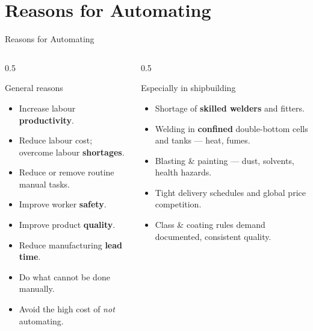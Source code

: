 \documentclass[aspectratio=169]{beamer}
\begin{document}
	\section{Reasons for Automating}
	\begin{frame}{Reasons for Automating}
		\begin{columns}[T]
			\begin{column}{0.5\textwidth}
				\begin{block}{General reasons}
					\begin{itemize}\small
						\item Increase labour \textbf{productivity}.
						\item Reduce labour cost; overcome labour \textbf{shortages}.
						\item Reduce or remove routine manual tasks.
						\item Improve worker \textbf{safety}.
						\item Improve product \textbf{quality}.
						\item Reduce manufacturing \textbf{lead time}.
						\item Do what cannot be done manually.
						\item Avoid the high cost of \emph{not} automating.
					\end{itemize}
				\end{block}
			\end{column}
			\begin{column}{0.5\textwidth}
				\begin{block}{Especially in shipbuilding}
					\begin{itemize}\small
						\item Shortage of \textbf{skilled welders} and fitters.
						\item Welding in \textbf{confined} double-bottom cells and tanks --- heat, fumes.
						\item Blasting \& painting --- dust, solvents, health hazards.
						\item Tight delivery schedules and global price competition.
						\item Class \& coating rules demand documented, consistent quality.
					\end{itemize}
				\end{block}
			\end{column}
		\end{columns}
	\end{frame}
\end{document}
